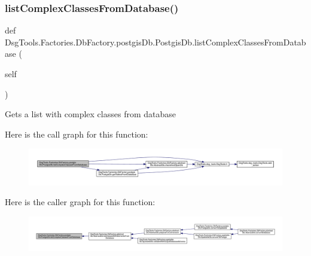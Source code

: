 \subsubsection{\texorpdfstring{list\+Complex\+Classes\+From\+Database()}{listComplexClassesFromDatabase()}}
{\footnotesize\ttfamily def Dsg\+Tools.\+Factories.\+Db\+Factory.\+postgis\+Db.\+Postgis\+Db.\+list\+Complex\+Classes\+From\+Database (\begin{DoxyParamCaption}\item[{}]{self }\end{DoxyParamCaption})}

\begin{DoxyVerb}Gets a list with complex classes from database
\end{DoxyVerb}
 Here is the call graph for this function\+:
\nopagebreak
\begin{figure}[H]
\begin{center}
\leavevmode
\includegraphics[width=350pt]{class_dsg_tools_1_1_factories_1_1_db_factory_1_1postgis_db_1_1_postgis_db_a3183409cb4384c67bfe6a41b2c9e0037_cgraph}
\end{center}
\end{figure}
Here is the caller graph for this function\+:
\nopagebreak
\begin{figure}[H]
\begin{center}
\leavevmode
\includegraphics[width=350pt]{class_dsg_tools_1_1_factories_1_1_db_factory_1_1postgis_db_1_1_postgis_db_a3183409cb4384c67bfe6a41b2c9e0037_icgraph}
\end{center}
\end{figure}
\mbox{\label{class_dsg_tools_1_1_factories_1_1_db_factory_1_1postgis_db_1_1_postgis_db_ac8bbdfcec0f449e4f45fff3392a8446b}} 
